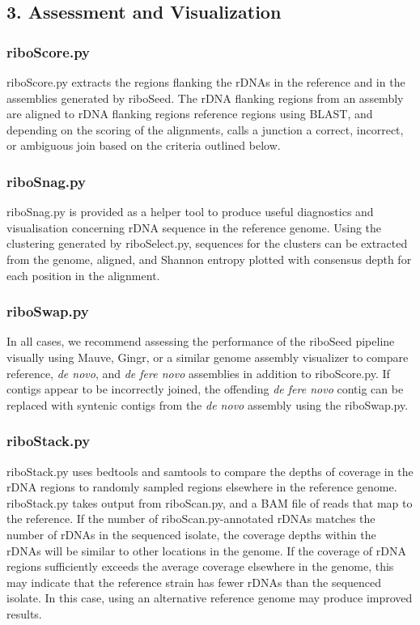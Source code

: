 \documentclass[10pt]{article}
\begin{document}
\begin{linenumbers}
\subsection*{3. Assessment and Visualization}
\subsubsection*{riboScore.py}
riboScore.py extracts the regions flanking the rDNAs in the reference and in the assemblies generated by riboSeed. The rDNA flanking regions from an assembly are aligned to rDNA flanking regions reference regions using BLAST, and depending on the scoring of the alignments, calls a junction a correct, incorrect, or ambiguous join based on the criteria outlined below.
\subsubsection*{riboSnag.py}
riboSnag.py is provided as a helper tool to produce useful diagnostics and visualisation concerning rDNA sequence in the reference genome. Using the clustering generated by riboSelect.py, sequences for the clusters can be extracted from the genome, aligned, and Shannon entropy \cite{Schmitt1997} plotted with consensus depth for each position in the alignment.
\subsubsection*{riboSwap.py}
In all cases, we recommend assessing the performance of the riboSeed pipeline visually using Mauve\cite{Darling2004,Darling2011}, Gingr\cite{Treangen2014}, or a similar genome assembly visualizer to compare reference, \textit{de novo}, and \textit{de fere novo} assemblies in addition to riboScore.py. If contigs appear to be incorrectly joined, the offending \textit{de fere novo} contig can be replaced with syntenic contigs from the \textit{de novo} assembly using the riboSwap.py.


\subsubsection*{riboStack.py}
riboStack.py uses bedtools\cite{Quinlan2010} and samtools\cite{Li2009} to compare the depths of coverage in the rDNA regions to randomly sampled regions elsewhere in the reference genome. riboStack.py takes output from riboScan.py, and a BAM file of reads that map to the reference. If the number of riboScan.py-annotated rDNAs matches the number of rDNAs in the sequenced isolate, the coverage depths within the rDNAs will be similar to other locations in the genome. If the coverage of rDNA regions sufficiently exceeds the average coverage elsewhere in the genome, this may indicate that the reference strain has fewer rDNAs than the sequenced isolate. In this case, using an alternative reference genome may produce improved results.


\end{linenumbers}
\end{document}
